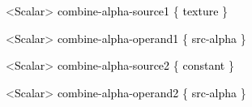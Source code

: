 \documentclass[a4paper]{article}
\newcommand\textstyleOOoComputerKeyWord[1]{\textrm{\textcolor[rgb]{0.0,0.0,0.5019608}{#1}}}
\newcommand\textstyleOOoAssemblerSpecialChar[1]{\textrm{\textcolor[rgb]{0.0,0.5019608,0.0}{#1}}}
\newcommand\textstyleOOoAssemblerIdent[1]{\textrm{\textcolor{black}{#1}}}
\begin{document}
{\color{black}
\textstyleOOoComputerKeyWord{\textcolor{black}{\ \ \ \ \ \ }}\textstyleOOoAssemblerSpecialChar{{\textless}}\textstyleOOoAssemblerIdent{Scalar}\textstyleOOoAssemblerSpecialChar{{\textgreater}}\textstyleOOoComputerKeyWord{\textcolor{black}{
}}\textstyleOOoAssemblerIdent{combine}\textstyleOOoAssemblerSpecialChar{{}-}\textstyleOOoAssemblerIdent{alpha}\textstyleOOoAssemblerSpecialChar{{}-}\textstyleOOoAssemblerIdent{source1}\textstyleOOoComputerKeyWord{\textcolor{black}{
}}\textstyleOOoAssemblerSpecialChar{\{}\textstyleOOoComputerKeyWord{\textcolor{black}{
}}\textstyleOOoAssemblerIdent{texture}\textstyleOOoComputerKeyWord{\textcolor{black}{
}}\textstyleOOoAssemblerSpecialChar{\}}}

{\color{black}
\textstyleOOoComputerKeyWord{\textcolor{black}{\ \ \ \ \ \ }}\textstyleOOoAssemblerSpecialChar{{\textless}}\textstyleOOoAssemblerIdent{Scalar}\textstyleOOoAssemblerSpecialChar{{\textgreater}}\textstyleOOoComputerKeyWord{\textcolor{black}{
}}\textstyleOOoAssemblerIdent{combine}\textstyleOOoAssemblerSpecialChar{{}-}\textstyleOOoAssemblerIdent{alpha}\textstyleOOoAssemblerSpecialChar{{}-}\textstyleOOoAssemblerIdent{operand1}\textstyleOOoComputerKeyWord{\textcolor{black}{
}}\textstyleOOoAssemblerSpecialChar{\{}\textstyleOOoComputerKeyWord{\textcolor{black}{
}}\textstyleOOoAssemblerIdent{src}\textstyleOOoAssemblerSpecialChar{{}-}\textstyleOOoAssemblerIdent{alpha}\textstyleOOoComputerKeyWord{\textcolor{black}{
}}\textstyleOOoAssemblerSpecialChar{\}}}

{\color{black}
\textstyleOOoComputerKeyWord{\textcolor{black}{\ \ \ \ \ \ }}\textstyleOOoAssemblerSpecialChar{{\textless}}\textstyleOOoAssemblerIdent{Scalar}\textstyleOOoAssemblerSpecialChar{{\textgreater}}\textstyleOOoComputerKeyWord{\textcolor{black}{
}}\textstyleOOoAssemblerIdent{combine}\textstyleOOoAssemblerSpecialChar{{}-}\textstyleOOoAssemblerIdent{alpha}\textstyleOOoAssemblerSpecialChar{{}-}\textstyleOOoAssemblerIdent{source2}\textstyleOOoComputerKeyWord{\textcolor{black}{
}}\textstyleOOoAssemblerSpecialChar{\{}\textstyleOOoComputerKeyWord{\textcolor{black}{
}}\textstyleOOoAssemblerIdent{constant}\textstyleOOoComputerKeyWord{\textcolor{black}{
}}\textstyleOOoAssemblerSpecialChar{\}}}

{\color{black}
\textstyleOOoComputerKeyWord{\textcolor{black}{\ \ \ \ \ \ }}\textstyleOOoAssemblerSpecialChar{{\textless}}\textstyleOOoAssemblerIdent{Scalar}\textstyleOOoAssemblerSpecialChar{{\textgreater}}\textstyleOOoComputerKeyWord{\textcolor{black}{
}}\textstyleOOoAssemblerIdent{combine}\textstyleOOoAssemblerSpecialChar{{}-}\textstyleOOoAssemblerIdent{alpha}\textstyleOOoAssemblerSpecialChar{{}-}\textstyleOOoAssemblerIdent{operand2}\textstyleOOoComputerKeyWord{\textcolor{black}{
}}\textstyleOOoAssemblerSpecialChar{\{}\textstyleOOoComputerKeyWord{\textcolor{black}{
}}\textstyleOOoAssemblerIdent{src}\textstyleOOoAssemblerSpecialChar{{}-}\textstyleOOoAssemblerIdent{alpha}\textstyleOOoComputerKeyWord{\textcolor{black}{
}}\textstyleOOoAssemblerSpecialChar{\}}}
\end{document}
